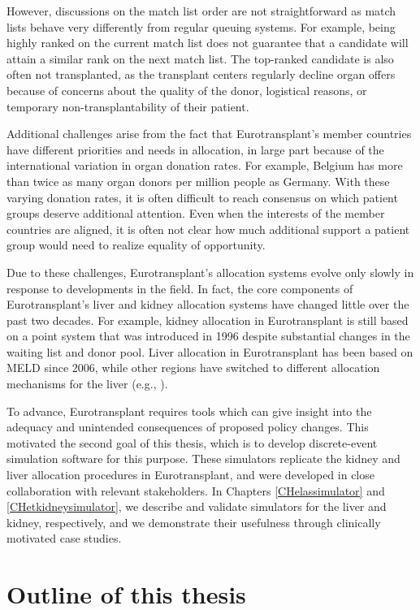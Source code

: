 \documentclass[11pt,twoside,]{book}
\begin{document}
However, discussions on the match list order are not straightforward as
match lists behave very differently from regular queuing systems. For example,
being highly ranked on the current match list does not guarantee that a
candidate will attain a similar rank on the next match list.
The top-ranked candidate is also often not transplanted, as the transplant
centers regularly decline organ offers because of concerns about the quality
of the donor, logistical reasons, or temporary non-transplantability of their
patient.

Additional challenges arise from the fact that Eurotransplant's member countries
have different priorities and needs in allocation, in large part because of
the international variation in organ donation rates. For example, Belgium has
more than twice as many organ donors per million people as Germany.
With these varying donation rates, it is often difficult to reach consensus on which
patient groups deserve additional attention. Even when the interests of the
member countries are aligned, it is often not clear how much additional
support a patient group would need to realize equality of opportunity.

Due to these challenges, Eurotransplant's allocation systems evolve only slowly in
response to developments in the field. In fact, the core components of Eurotransplant's
liver and kidney allocation systems have changed little over the past two
decades. For example, kidney allocation in Eurotransplant is still based on
a point system that was introduced in 1996 despite substantial changes in
the waiting list and donor pool. Liver allocation in Eurotransplant has been
based on MELD since 2006, while other regions have switched to different
allocation mechanisms for the liver (e.g., \citep{Allen2024, kimMELD3point0}).

To advance, Eurotransplant requires tools which can give
insight into the adequacy and unintended consequences of proposed policy changes.
This motivated the second goal of this thesis, which is to develop
discrete-event simulation software for this purpose. These simulators replicate the kidney and liver
allocation procedures in Eurotransplant, and were developed in close
collaboration with relevant stakeholders. In Chapters \ref{CHelassimulator}
and \ref{CHetkidneysimulator}, we describe and validate simulators for the
liver and kidney, respectively, and we demonstrate their usefulness through
clinically motivated case studies.

\section{Outline of this thesis}\label{outline-of-this-thesis}
\end{document}
